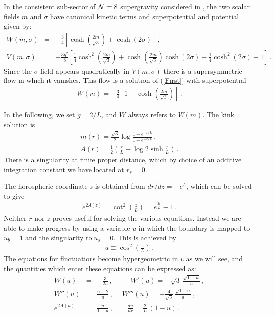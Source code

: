 \documentclass[a4paper,12pt]{article}
\begin{document}
In the consistent sub-sector of ${\cal N}=8$ supergravity considered in
\cite{gppz}, the two scalar fields $m$ and $\sigma$ have canonical
kinetic terms and superpotential and potential given by:
\begin{eqnarray}
W(m, \sigma) &=& - \frac{3}{4} \left[ \cosh \left( \frac{2m}{\sqrt{3}} \right) + \cosh \left(2 \sigma \right) \right] \,, \\
V(m, \sigma) &=& - \frac{3g^2}{8} \left[  \frac{1}{4} \cosh^2 \left( \frac{2m}{\sqrt{3}} \right) +  \cosh\left(\frac{2
m}{\sqrt{3}}\right) \cosh(2 \sigma) - \frac{1}{4} \cosh^2 (2 \sigma) + 1 
\right] \,. \label{msigmapot}
\end{eqnarray}
Since the $\sigma$ field appears quadratically in $V(m,\sigma)$ there is a
supersymmetric flow in which it vanishes. This flow is a solution of
(\ref{First}) with superpotential
\begin{eqnarray}
W(m) = - \frac{3}{4} \left[1 + \cosh \left(\frac{2m}{\sqrt{3}} \right)
\right] \,.
\end{eqnarray}

In the following, we set $g = 2/L$, and $W$ always refers to $W(m)$.  The kink
solution is
\begin{eqnarray}
m(r) = \frac{\sqrt{3}}{2} \log \frac{1+ e^{-r/L}}{1-e^{-r/L}} \,, \\
A(r) = \frac{1}{2} \left( \frac{r}{L} + \log 2 \sinh \frac{r}{L} \right) \,.
\end{eqnarray}
There is a singularity at finite proper distance, which by choice of
an additive integration constant we have located at $r_s=0$.

The horospheric coordinate $z$ is obtained from
$dr/dz = - e^A$, which can be solved to give
\begin{eqnarray}
e^{2A(z)} = \cot^2 \left( \frac{z}{L} \right) = e^{\frac{2r}{L}} -1 \,.
\end{eqnarray}
Neither $r$ nor $z$ proves useful for solving the various equations.
Instead we are able to make progress by using a variable $u$ in which
the boundary is mapped to $u_b = 1$ and the singularity to $u_s = 0$.
This is achieved by
\begin{eqnarray}
\label{udef}
u \equiv \cos^2 \left( \frac{z}{L} \right) \,.
\end{eqnarray}
The equations for fluctuations become hypergeometric in $u$ as we will see,
and the quantities which enter these equations can be expressed as:
\begin{eqnarray}
\label{symreference}
W(u) &=& - \frac{3}{2u} \,, \quad \quad \;\;
W'(u) = - \sqrt{3} \; \frac{\sqrt{1-u}}{u} \,, \nonumber \\
W''(u) &=&  \frac{u-2}{u} \,, \quad \;
W'''(u) = - \frac{4}{\sqrt{3}} \, \frac{\sqrt{1-u}}{u} \,, 
\\
e^{2A(u)} &=& \frac{u}{1-u} \,, \quad \quad 
\frac{du}{dr} = \frac{2}{L} \, (1-u) \,. \nonumber
\end{eqnarray}
\end{document}
